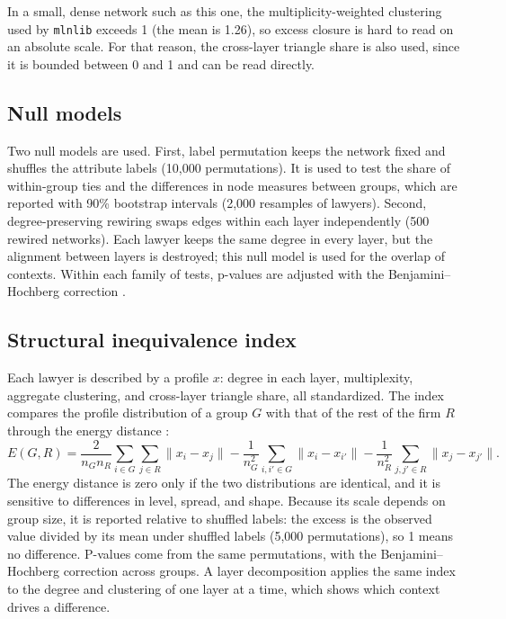 \documentclass[11pt]{article}
\begin{document}
In a small, dense network such as this one, the multiplicity-weighted clustering used by \texttt{mlnlib} exceeds 1 (the mean is 1.26), so excess closure is hard to read on an absolute scale. For that reason, the cross-layer triangle share is also used, since it is bounded between 0 and 1 and can be read directly.

\subsection{Null models}
Two null models are used. First, label permutation keeps the network fixed and shuffles the attribute labels (10,000 permutations). It is used to test the share of within-group ties and the differences in node measures between groups, which are reported with 90\% bootstrap intervals (2,000 resamples of lawyers). Second, degree-preserving rewiring swaps edges within each layer independently (500 rewired networks). Each lawyer keeps the same degree in every layer, but the alignment between layers is destroyed; this null model is used for the overlap of contexts. Within each family of tests, p-values are adjusted with the Benjamini--Hochberg correction \citep{benjamini1995}.

\subsection{Structural inequivalence index}
Each lawyer is described by a profile $x$: degree in each layer, multiplexity, aggregate clustering, and cross-layer triangle share, all standardized. The index compares the profile distribution of a group $G$ with that of the rest of the firm $R$ through the energy distance \citep{szekely2013}:
\begin{equation}
E(G,R) = \frac{2}{n_G n_R}\sum_{i\in G}\sum_{j\in R}\lVert x_i - x_j\rVert
 - \frac{1}{n_G^2}\sum_{i,i'\in G}\lVert x_i - x_{i'}\rVert
 - \frac{1}{n_R^2}\sum_{j,j'\in R}\lVert x_j - x_{j'}\rVert .
\end{equation}
The energy distance is zero only if the two distributions are identical, and it is sensitive to differences in level, spread, and shape. Because its scale depends on group size, it is reported relative to shuffled labels: the excess is the observed value divided by its mean under shuffled labels (5,000 permutations), so 1 means no difference. P-values come from the same permutations, with the Benjamini--Hochberg correction across groups. A layer decomposition applies the same index to the degree and clustering of one layer at a time, which shows which context drives a difference.
\end{document}
